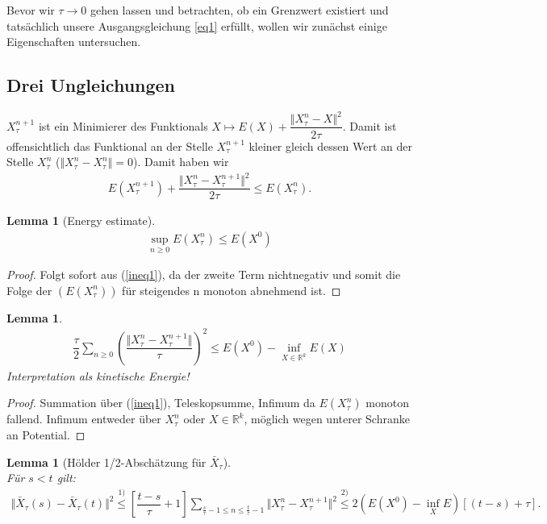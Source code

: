 \documentclass[11pt,a4paper,notitlepage]{scrreprt}
\newcommand{\RR}{\mathbb{R}}
\newtheorem{lem}[defi]{Lemma}
\begin{document}
Bevor wir $\tau \to 0$ gehen lassen und betrachten, ob ein Grenzwert existiert und tatsächlich unsere Ausgangsgleichung \ref{eq1} erfüllt, wollen wir zunächst einige Eigenschaften untersuchen. 

\subsection{Drei Ungleichungen}



$X_\tau^{n+1}$ ist ein Minimierer des Funktionals $X \mapsto E(X)+\dfrac{\Vert X_\tau^n-X\Vert^2}{2\tau}$. Damit ist offensichtlich das Funktional an der Stelle $X_\tau^{n+1}$ kleiner gleich dessen Wert an der Stelle $X_\tau^n$ ($\Vert X_\tau^n-X_\tau^n\Vert=0$). Damit haben wir
\begin{eqnarray}
E(X_\tau^{n+1})+\dfrac{\Vert X_\tau^n-X_\tau^{n+1}\Vert^2}{2\tau}\leq E(X_\tau^n). \label{ineq1}
\end{eqnarray} 
\begin{lem}[Energy estimate]
\begin{eqnarray}
\sup_{n\geq 0}E(X_\tau^n)\leq E(X^0) \label{enest}
\end{eqnarray}
\end{lem}
\begin{proof}
Folgt sofort aus (\ref{ineq1}), da der zweite Term nichtnegativ und somit die Folge der $(E(X_\tau^n))$ für steigendes n monoton abnehmend ist. 
\end{proof}

\begin{lem}
\begin{eqnarray}
\dfrac{\tau}{2}\sum_{n\geq 0} \left(\dfrac{\Vert X_\tau^n-X_\tau^{n+1}\Vert}{\tau}\right)^2\leq E(X^0)-\inf_{X\in\RR^k} E(X)\label{totalsquare}
\end{eqnarray}
Interpretation als kinetische Energie!
\end{lem}
\begin{proof}
Summation über (\ref{ineq1}), Teleskopsumme, Infimum da $E(X_\tau^n)$ monoton fallend. Infimum entweder über $X_\tau^n$ oder $X\in\RR^k$, möglich wegen unterer Schranke an Potential. 
\end{proof}

\begin{lem}[Hölder 1/2-Abschätzung für $\bar{X}_\tau$]  $~~$ \\
Für $s<t$ gilt:
\begin{eqnarray}
\Vert \bar{X}_\tau(s)-\bar{X}_\tau(t)\Vert^2 \overset{1)}\leq \left[\dfrac{t-s}{\tau}+1\right] \sum_{\frac{s}{\tau}-1\leq n \leq \frac{t}{\tau}-1} \Vert X^n_\tau- X_\tau^{n+1}\Vert^2 \overset{2)}\leq 2(E(X^0)-\inf_X E)[(t-s)+\tau]. \label{Hölder}
\end{eqnarray}
\end{lem}
\end{document}
